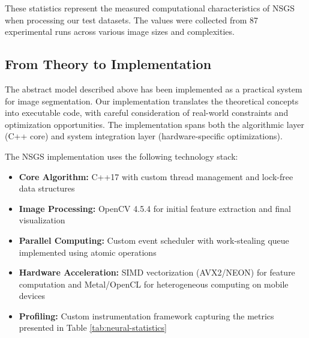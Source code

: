 \documentclass[conference]{IEEEtran}
\begin{document}
\begin{table}[t]
\caption{NSGS Neural Processing Statistics}
\label{tab:neural-statistics}
\centering
{}
\end{table}

These statistics represent the measured computational characteristics of NSGS when processing our test datasets. The values were collected from 87 experimental runs across various image sizes and complexities.

\subsection{From Theory to Implementation}
The abstract model described above has been implemented as a practical system for image segmentation. Our implementation translates the theoretical concepts into executable code, with careful consideration of real-world constraints and optimization opportunities. The implementation spans both the algorithmic layer (C++ core) and system integration layer (hardware-specific optimizations).

The NSGS implementation uses the following technology stack:
\begin{itemize}
    \item \textbf{Core Algorithm:} C++17 with custom thread management and lock-free data structures
    \item \textbf{Image Processing:} OpenCV 4.5.4 for initial feature extraction and final visualization
    \item \textbf{Parallel Computing:} Custom event scheduler with work-stealing queue implemented using atomic operations
    \item \textbf{Hardware Acceleration:} SIMD vectorization (AVX2/NEON) for feature computation and Metal/OpenCL for heterogeneous computing on mobile devices
    \item \textbf{Profiling:} Custom instrumentation framework capturing the metrics presented in Table \ref{tab:neural-statistics}
\end{itemize}
\end{document}
